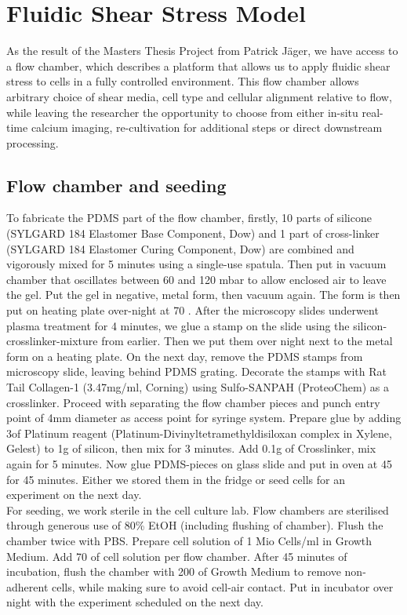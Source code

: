 \section{Fluidic Shear Stress Model}
As the result of the Masters Thesis Project from Patrick Jäger, we have access to a flow chamber, which describes a platform that allows us to apply fluidic shear stress to cells in a fully controlled environment. This flow chamber allows arbitrary choice of shear media, cell type and cellular alignment relative to flow, while leaving the researcher the opportunity to choose from either in-situ real-time calcium imaging, re-cultivation for additional steps or direct downstream processing.

\subsection{Flow chamber and seeding}
\label{sec:FluidicModel}
To fabricate the PDMS part of the flow chamber, firstly, 10 parts of silicone (SYLGARD\texttrademark{} 184 Elastomer Base Component, Dow) and 1 part of cross-linker (SYLGARD\texttrademark{} 184 Elastomer Curing Component, Dow) are combined and vigorously mixed for 5 minutes using a single-use spatula. Then put in vacuum chamber that oscillates between 60 and 120 mbar to allow enclosed air to leave the gel. Put the gel in negative, metal form, then vacuum again. The form is then put on heating plate over-night at 70 \degC{}. After the microscopy slides underwent plasma treatment for 4 minutes, we glue a stamp on the slide using the silicon-crosslinker-mixture from earlier. Then we put them over night next to the metal form on a heating plate. On the next day, remove the PDMS stamps from microscopy slide, leaving behind PDMS grating. Decorate the stamps with Rat Tail Collagen-1 (3.47mg/ml, Corning) using Sulfo-SANPAH (ProteoChem) as a crosslinker. Proceed with separating the flow chamber pieces and punch entry point of 4mm diameter as access point for syringe system. Prepare glue by adding 3\mul of Platinum reagent (Platinum-Divinyltetramethyldisiloxan complex in Xylene, Gelest) to 1g of silicon, then mix for 3 minutes. Add 0.1g of Crosslinker, mix again for 5 minutes. Now glue PDMS-pieces on glass slide and put in oven at 45 \degC{} for 45 minutes. Either we stored them in the fridge or seed cells for an experiment on the next day.\\
For seeding, we work sterile in the cell culture lab. Flow chambers are sterilised through generous use of 80\% EtOH (including flushing of chamber). Flush the chamber twice with PBS. Prepare cell solution of 1 Mio Cells/ml in Growth Medium. Add 70 \mul{} of cell solution per flow chamber. After 45 minutes of incubation, flush the chamber with 200\mul{} of Growth Medium to remove non-adherent cells, while making sure to avoid cell-air contact. Put in incubator over night with the experiment scheduled on the next day.

